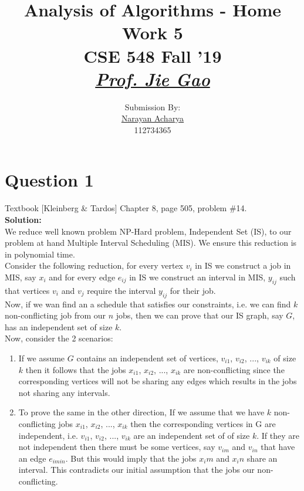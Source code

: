 \documentclass[11pt]{article}
\title{
	Analysis of Algorithms - Home Work 5\\[2mm]
	\large CSE 548 Fall '19\\[1mm]
	\href{mailto:jgao@cs.stonybrook.edu}{\textit{Prof. Jie Gao}}
}
\author{
	\small Submission By: \\
	\href{mailto:nacharya@cs.stonybrook.edu}{Narayan Acharya} \\
	\small 112734365
}
\date{\vspace{-5ex}}
\begin{document}
\maketitle
\thispagestyle{fancy} %

\tableofcontents

\section{Question 1} Textbook [Kleinberg \& Tardos] Chapter 8, page 505, problem \#14. \\
\textbf{Solution:} \\

We reduce well known problem NP-Hard problem, Independent Set (IS), to our problem at hand Multiple Interval Scheduling (MIS). We ensure this reduction is in polynomial time. \\

Consider the following reduction, for every vertex $ v_i $ in IS we construct a job in MIS, say $ x_i $ and for every edge $ e_{ij} $ in IS we construct an interval in MIS, $ y_{ij} $ such that vertices $ v_i $ and $ v_j $ require the interval $ y_{ij} $ for their job. \\

Now, if we wan find an a schedule that satisfies our constraints, i.e. we can find $ k $ non-conflicting job from our $ n $ jobs, then we can prove that our IS graph, say $ G $, has an independent set of size $ k $. \\

Now, consider the 2 scenarios:
\begin{enumerate}
\item If we assume $ G $ contains an independent set of vertices, {$ v_{i1} $, $ v_{i2} $, $...$, $ v_{ik} $} of size $ k $ then it follows that the jobs {$x_{i1} $, $ x_{i2} $, $...$, $ x_{ik} $} are non-conflicting since the corresponding vertices will not be sharing any edges which results in the jobs not sharing any intervals.

\item To prove the same in the other direction, If we assume that we have $ k $ non-conflicting jobs {$x_{i1} $, $ x_{i2} $, $...$, $ x_{ik} $} then the corresponding vertices in G are independent, i.e. {$ v_{i1} $, $ v_{i2} $, $...$, $ v_{ik} $} are an independent set of of size $ k $. If they are not independent then there must be some vertices, say $ v_{im} $ and $ v_{in} $ that have an edge $ e_{imin} $. But this would imply that the jobs $ x_im $ and $ x_in $ share an interval. This contradicts our initial assumption that the jobs our non-conflicting.
\end{enumerate}
\end{document}

